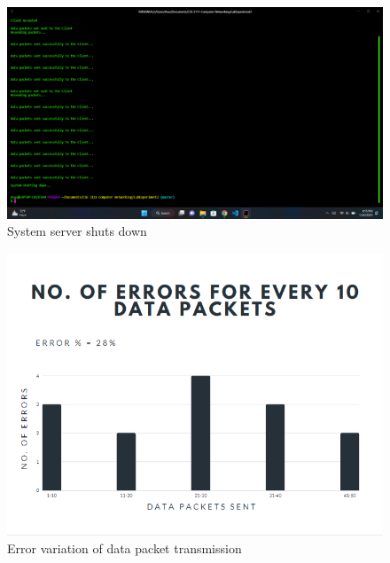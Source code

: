 \documentclass[11pt]{article}
\begin{document}
\begin{figure}[!h]
\centering
\includegraphics[width=\textwidth]{128.png}
\caption{System server shuts down}
\end{figure}

\newpage

\begin{figure}[!h]
\centering
\includegraphics[width=\textwidth]{130}
\caption{ Error variation of data packet transmission}
\end{figure}











\newpage
\end{document}
